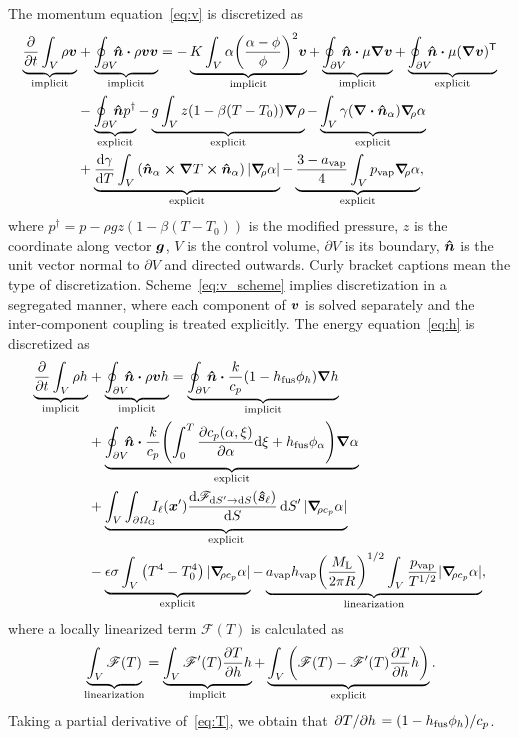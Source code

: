 \documentclass[final]{elsarticle} %
\newcommand{\tran}{\mathsf{T}} %
\newcommand{\fusion}[1]{{#1}_\text{fus}}
\newcommand{\evapor}[1]{{#1}_\text{vap}}
\newcommand{\gradf}[1]{\grad_{\!\! #1}}
\newcommand{\SourceTerm}{\mathscr{F}}
\newcommand{\liq}{\text{L}}
\newcommand{\gas}{\text{G}}
\newcommand{\laser}{\ell} %
\newcommand{\viewfactor}[3]{{#1}_{\dd{S}#2\to\dd{S}#3}}
\newcommand{\dviewfactor}[4][]{{\dv{\viewfactor{#2}{#3}{#4}#1}{S#4}}}
\newcommand{\bv}{\vb*{v}}
\newcommand{\bn}{\vu*{n}}
\newcommand{\bs}{\vu*{s}}
\newcommand{\bx}{\vb*{x}}
\newcommand{\bg}{\vb*{g}}
\newcommand{\V}{V}
\newcommand{\dV}{\partial V}
\newcommand{\intCell}{\int_{\V}}
\newcommand{\intFaces}{\oint_{\dV}\!\!\!\bn}
\newcommand{\implicit}[1]{\underbrace{#1}_\text{implicit}}
\newcommand{\explicit}[1]{\underbrace{#1}_\text{explicit}}
\newcommand{\linearization}[1]{\underbrace{#1}_\text{linearization}}
\begin{document}
The momentum equation~\eqref{eq:v} is discretized as
\begin{equation}\label{eq:v_scheme}
    \begin{split}
      \implicit{\pdv{t}\intCell\rho\bv}
   &+ \implicit{\intFaces\vdot\rho\bv\bv} =
    - \implicit{K\intCell\alpha\qty(\frac{\alpha-\phi}{\phi})^2\bv}
    + \implicit{\intFaces\vdot\mu\grad\bv}
    + \explicit{\intFaces\vdot\mu(\grad\bv)^\tran} \\
   &- \explicit{\intFaces p^\dag}
    - \explicit{g\intCell z(1-\beta(T-T_0))\grad\rho}
    - \explicit{\intCell\gamma(\div\bn_\alpha)\gradf{\rho}\alpha} \\
   &+ \explicit{\dv{\gamma}{T}\intCell\qty(\bn_\alpha\cp\grad{T}\cp\bn_\alpha)|\gradf{\rho}\alpha|}
    - \explicit{\frac{3-\evapor{a}}4\intCell\evapor{p}\gradf{\rho}\alpha},
    \end{split}
\end{equation}
where $p^\dag = p - \rho gz(1-\beta(T-T_0))$ is the modified pressure,
$z$ is the coordinate along vector $\bg$,
$\V$ is the control volume, $\dV$ is its boundary,
$\bn$ is the unit vector normal to $\dV$ and directed outwards.
Curly bracket captions mean the type of discretization.
Scheme~\eqref{eq:v_scheme} implies discretization in a segregated manner,
where each component of $\bv$ is solved separately
and the inter-component coupling is treated explicitly.
The energy equation~\eqref{eq:h} is discretized as
\begin{equation}\label{eq:h_scheme}
    \begin{split}
      \implicit{\pdv{t}\intCell\rho h}
   &+ \implicit{\intFaces\vdot\rho\bv h}
    = \implicit{\intFaces\vdot\frac{k}{c_p}(1-\fusion{h}\phi_h)\grad{h}}\\
   &+ \explicit{\intFaces\vdot\frac{k}{c_p}\qty(
        \int_0^T \pdv{c_p(\alpha,\xi)}{\alpha}\dd\xi + \fusion{h}\phi_\alpha
      )\grad\alpha}\\
   &+ \explicit{\intCell\int_{\partial\Omega_\gas}\!\!\! I_\laser(\bx')
        \dviewfactor[(\bs_\laser)]{\mathscr{F}}{'}{} \dd{S}' |\gradf{\rho c_p}\alpha|}\\
   &- \explicit{\epsilon\sigma\intCell\qty(T^4-T_0^4)|\gradf{\rho c_p}\alpha|}
    - \linearization{\evapor{a}\evapor{h}\qty(\frac{M_\liq}{2\pi R})^{1/2}\intCell
        \frac{\evapor{p}}{T^{1/2}}|\gradf{\rho c_p}\alpha|},
    \end{split}
\end{equation}
where a locally linearized term $\SourceTerm(T)$ is calculated as
\begin{equation}\label{eq:linearization}
    \linearization{\intCell \SourceTerm(T)} = \implicit{\intCell \SourceTerm'(T)\pdv{T}{h}h}
        + \explicit{ \intCell\qty(\SourceTerm(T) - \SourceTerm'(T)\pdv{T}{h}h)}.
\end{equation}
Taking a partial derivative of~\eqref{eq:T},
we obtain that $\pdv*{T}{h} = (1-\fusion{h}\phi_h)/c_p$.
\end{document}
